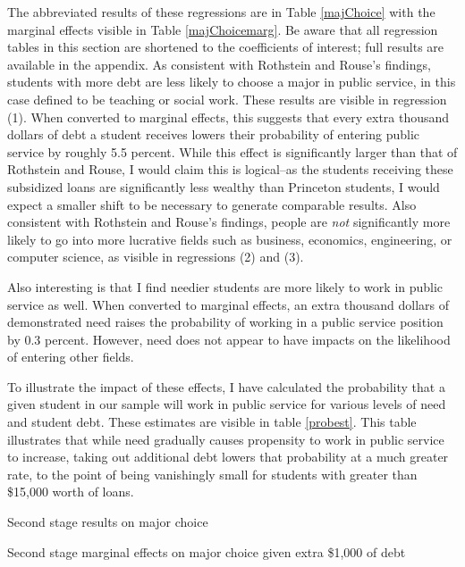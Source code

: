 \documentclass[12pt]{article}
\newcommand{\regs}{../Analysis/Regressions/Output/}
\begin{document}
	The abbreviated results of these regressions are in Table \ref{majChoice} with the marginal effects visible in Table \ref{majChoicemarg}. Be aware that all regression tables in this section are shortened to the coefficients of interest; full results are available in the appendix. As consistent with Rothstein and Rouse's findings, students with more debt are less likely to choose a major in public service, in this case defined to be teaching or social work. These results are visible in regression (1). When converted to marginal effects, this suggests that every extra thousand dollars of debt a student receives lowers their probability of entering public service by roughly 5.5 percent. While this effect is significantly larger than that of Rothstein and Rouse, I would claim this is logical--as the students receiving these subsidized loans are significantly less wealthy than Princeton students, I would expect a smaller shift to be necessary to generate comparable results. Also consistent with Rothstein and Rouse's findings, people are \emph{not} significantly more likely to go into more lucrative fields such as business, economics, engineering, or computer science, as visible in regressions (2) and (3). 
	
	Also interesting is that I find needier students are more likely to work in public service as well. When converted to marginal effects, an extra thousand dollars of demonstrated need raises the probability of working in a public service position by 0.3 percent. However, need does not appear to have impacts on the likelihood of entering other fields.
	
	To illustrate the impact of these effects, I have calculated the probability that a given student in our sample will work in public service for various levels of need and student debt. These estimates are visible in table \ref{probest}. This table illustrates that while need gradually causes propensity to work in public service to increase, taking out additional debt lowers that probability at a much greater rate, to the point of being vanishingly small for students with greater than \$15,000 worth of loans.

	\begin{table}
		\centering
		\caption{Second stage results on major choice}	
		\resizebox{\textwidth}{!}{	
			
		}
		\label{majChoice}
	\end{table}

	\begin{table}
		\centering
		\caption{Second stage marginal effects on major choice given extra \$1,000 of debt}	
		\resizebox{\textwidth}{!}{	
			
		}
		\label{majChoicemarg}
	\end{table}
\end{document}

